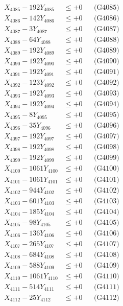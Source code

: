 \documentclass[a4paper,10pt]{article}
\begin{document}
{\begin{align}
X_{4085} - 192Y_{4085} &\leq +0 && \text{(G4085)} \\
X_{4086} - 142Y_{4086} &\leq +0 && \text{(G4086)} \\
X_{4087} - 3Y_{4087} &\leq +0 && \text{(G4087)} \\
X_{4088} - 64Y_{4088} &\leq +0 && \text{(G4088)} \\
X_{4089} - 192Y_{4089} &\leq +0 && \text{(G4089)} \\
X_{4090} - 192Y_{4090} &\leq +0 && \text{(G4090)} \\
\allowbreak
X_{4091} - 192Y_{4091} &\leq +0 && \text{(G4091)} \\
X_{4092} - 123Y_{4092} &\leq +0 && \text{(G4092)} \\
X_{4093} - 192Y_{4093} &\leq +0 && \text{(G4093)} \\
X_{4094} - 192Y_{4094} &\leq +0 && \text{(G4094)} \\
X_{4095} - 8Y_{4095} &\leq +0 && \text{(G4095)} \\
X_{4096} - 35Y_{4096} &\leq +0 && \text{(G4096)} \\
X_{4097} - 192Y_{4097} &\leq +0 && \text{(G4097)} \\
X_{4098} - 192Y_{4098} &\leq +0 && \text{(G4098)} \\
X_{4099} - 192Y_{4099} &\leq +0 && \text{(G4099)} \\
X_{4100} - 1061Y_{4100} &\leq +0 && \text{(G4100)} \\
\allowbreak
X_{4101} - 1061Y_{4101} &\leq +0 && \text{(G4101)} \\
X_{4102} - 944Y_{4102} &\leq +0 && \text{(G4102)} \\
X_{4103} - 601Y_{4103} &\leq +0 && \text{(G4103)} \\
X_{4104} - 185Y_{4104} &\leq +0 && \text{(G4104)} \\
X_{4105} - 98Y_{4105} &\leq +0 && \text{(G4105)} \\
X_{4106} - 136Y_{4106} &\leq +0 && \text{(G4106)} \\
X_{4107} - 265Y_{4107} &\leq +0 && \text{(G4107)} \\
X_{4108} - 684Y_{4108} &\leq +0 && \text{(G4108)} \\
X_{4109} - 588Y_{4109} &\leq +0 && \text{(G4109)} \\
X_{4110} - 1061Y_{4110} &\leq +0 && \text{(G4110)} \\
\allowbreak
X_{4111} - 514Y_{4111} &\leq +0 && \text{(G4111)} \\
X_{4112} - 25Y_{4112} &\leq +0 && \text{(G4112)} \\

\end{align}}
\end{document}
